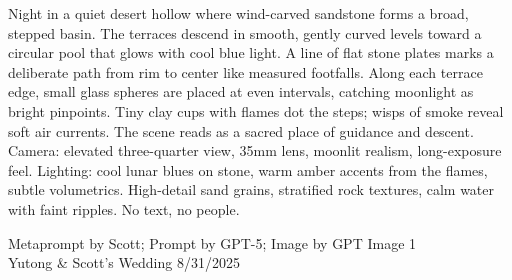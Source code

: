 \documentclass[12pt]{article}
\begin{document}
\noindent
\begin{adjustbox}{max size={\textwidth}{\textheight}}
\begin{varwidth}{\textwidth}
\RaggedRight
\footnotesize
Night in a quiet desert hollow where wind-carved sandstone forms a broad, stepped basin. The terraces descend in smooth, gently curved levels toward a circular pool that glows with cool blue light. A line of flat stone plates marks a deliberate path from rim to center like measured footfalls. Along each terrace edge, small glass spheres are placed at even intervals, catching moonlight as bright pinpoints. Tiny clay cups with flames dot the steps; wisps of smoke reveal soft air currents. The scene reads as a sacred place of guidance and descent. Camera: elevated three-quarter view, 35mm lens, moonlit realism, long-exposure feel. Lighting: cool lunar blues on stone, warm amber accents from the flames, subtle volumetrics. High-detail sand grains, stratified rock textures, calm water with faint ripples. No text, no people.
\end{varwidth}
\end{adjustbox}
\vfill
{\raggedleft\footnotesize
Metaprompt by Scott; Prompt by GPT-5; Image by GPT Image 1 \\
Yutong \& Scott's Wedding 8/31/2025\par}
\end{document}
